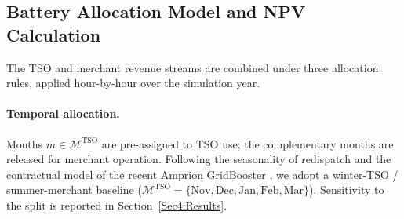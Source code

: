  
 \subsection{Battery Allocation Model and NPV Calculation}\label{subsec3:Battery_Allocation_Model}
 
The TSO and merchant revenue streams are combined under three allocation rules, applied hour-by-hour over the simulation year.
 
\paragraph{Temporal allocation.} Months $m \in \mathcal{M}^{\mathrm{TSO}}$ are pre-assigned to TSO use; the complementary months are released for merchant operation. Following the seasonality of redispatch \citep{Titz_2024_Drivers_Congestion_Redispatch_Germany} and the contractual model of the recent Amprion GridBooster \citep{ESSNews_2025_Amprion_GridBooster_Project}, we adopt a winter-TSO / summer-merchant baseline ($\mathcal{M}^{\mathrm{TSO}} = \{\mathrm{Nov, Dec, Jan, Feb, Mar}\}$). Sensitivity to the split is reported in Section~\ref{Sec4:Results}.
 
